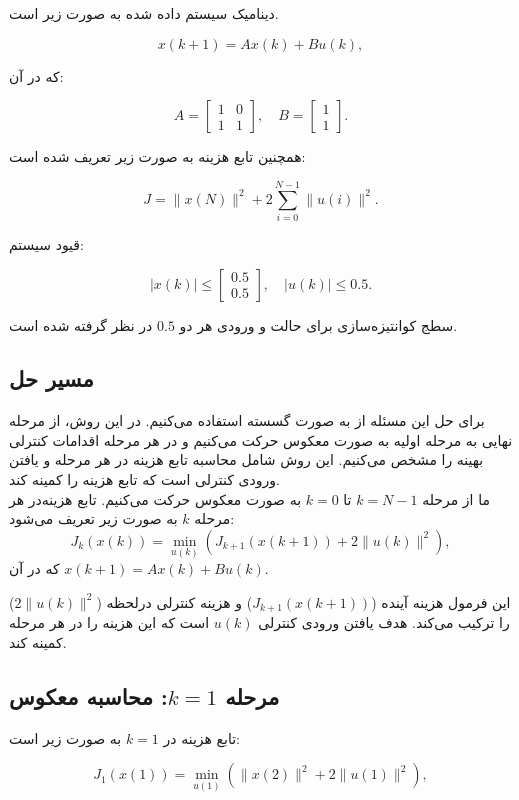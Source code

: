 \documentclass[14pt, a4paper]{extarticle}
\begin{document}
	دینامیک سیستم داده شده به صورت زیر است.
	
	\[
	x(k + 1) = A x(k) + B u(k),
	\]
	
	که در آن:
	
	\[
	A = \begin{bmatrix} 1 & 0 \\ 1 & 1 \end{bmatrix}, \quad B = \begin{bmatrix} 1 \\ 1 \end{bmatrix}.
	\]
	
	همچنین تابع هزینه به صورت زیر تعریف شده است:
	
	\[
	J = \|x(N)\|^2 + 2 \sum_{i=0}^{N-1} \|u(i)\|^2.
	\]
	
	قیود سیستم:
	
	\[
	|x(k)| \leq \begin{bmatrix} 0.5 \\ 0.5 \end{bmatrix}, \quad |u(k)| \leq 0.5.
	\]
	
	سطج کوانتیزه‌سازی برای حالت و ورودی هر دو
	 \(0.5\) در نظر گرفته شده است.
	
	\subsection*{مسیر حل}
	برای حل این مسئله از 
	 به صورت گسسته استفاده می‌کنیم. در این روش، از مرحله نهایی به مرحله اولیه به صورت معکوس حرکت می‌کنیم و در هر مرحله اقدامات کنترلی بهینه را مشخص می‌کنیم. این روش شامل محاسبه تابع هزینه‌ در هر مرحله و یافتن ورودی کنترلی است که تابع هزینه را کمینه کند.\\
	ما از مرحله \( k = N-1 \) تا \( k = 0 \) به صورت معکوس حرکت می‌کنیم. تابع هزینه‌در هر مرحله \( k \) به صورت زیر تعریف می‌شود:
	\[
	J_k(x(k)) = \min_{u(k)} \left( J_{k+1}(x(k+1)) + 2\|u(k)\|^2 \right),
	\]
	که در آن \( x(k+1) = A x(k) + B u(k) \).
	
 این فرمول هزینه آینده (\( J_{k+1}(x(k+1)) \)) و هزینه کنترلی درلحظه (\( 2\|u(k)\|^2 \)) را ترکیب می‌کند. هدف یافتن ورودی کنترلی \( u(k) \) است که این هزینه را در هر مرحله کمینه کند.
	
	\subsection*{مرحله \( k = 1 \): محاسبه معکوس}
	تابع هزینه‌ در \( k = 1 \) به صورت زیر است:

	\[
	J_1(x(1)) = \min_{u(1)} \left( \|x(2)\|^2 + 2\|u(1)\|^2 \right),
	\]
	
\end{document}
